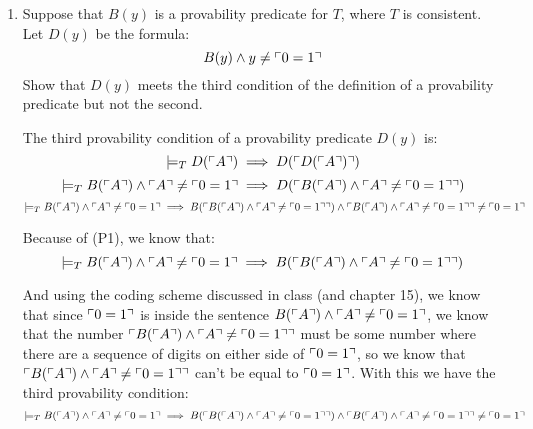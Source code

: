 \begin{enumerate}
  \item
    \begin{question}
      Suppose that $B(y)$ is a provability predicate for $T$, where $T$ is consistent. Let $D(y)$ be the formula:
      $$B(y) \land y \neq \ulcorner 0=1 \urcorner$$
      Show that $D(y)$ meets the third condition of the definition of a provability predicate but not the second.
    \end{question}

    The third provability condition of a provability predicate $D(y)$ is:
    $$\mathrel{|}\!=_T D(\ulcorner A \urcorner) \implies D(\ulcorner D(\ulcorner A \urcorner) \urcorner)$$
    $$\mathrel{|}\!=_T B(\ulcorner A \urcorner) \land \ulcorner A \urcorner \neq \ulcorner 0=1 \urcorner \implies D(\ulcorner B(\ulcorner A \urcorner) \land \ulcorner A \urcorner \neq \ulcorner 0=1 \urcorner \urcorner)$$
    $$\mathrel{|}\!=_T B(\ulcorner A \urcorner) \land \ulcorner A \urcorner \neq \ulcorner 0=1 \urcorner \implies B(\ulcorner B(\ulcorner A \urcorner) \land \ulcorner A \urcorner \neq \ulcorner 0=1 \urcorner \urcorner) \land \ulcorner B(\ulcorner A \urcorner) \land \ulcorner A \urcorner \neq \ulcorner 0=1 \urcorner \urcorner \neq \ulcorner 0=1 \urcorner$$

    Because of (P1), we know that:
    $$\mathrel{|}\!=_T B(\ulcorner A \urcorner) \land \ulcorner A \urcorner \neq \ulcorner 0=1 \urcorner \implies B(\ulcorner B(\ulcorner A \urcorner) \land \ulcorner A \urcorner \neq \ulcorner 0=1 \urcorner \urcorner)$$

    And using the coding scheme discussed in class (and chapter 15), we know that since $\ulcorner 0=1 \urcorner$ is inside the sentence $B(\ulcorner A \urcorner) \land \ulcorner A \urcorner \neq \ulcorner 0=1 \urcorner$, we know that the number $\ulcorner B(\ulcorner A \urcorner) \land \ulcorner A \urcorner \neq \ulcorner 0=1 \urcorner \urcorner$ must be some number where there are a sequence of digits on either side of $\ulcorner 0=1 \urcorner$, so we know that $\ulcorner B(\ulcorner A \urcorner) \land \ulcorner A \urcorner \neq \ulcorner 0=1 \urcorner \urcorner$ can't be equal to $\ulcorner 0=1 \urcorner$. With this we have the third provability condition:
    $$\mathrel{|}\!=_T B(\ulcorner A \urcorner) \land \ulcorner A \urcorner \neq \ulcorner 0=1 \urcorner \implies B(\ulcorner B(\ulcorner A \urcorner) \land \ulcorner A \urcorner \neq \ulcorner 0=1 \urcorner \urcorner) \land \ulcorner B(\ulcorner A \urcorner) \land \ulcorner A \urcorner \neq \ulcorner 0=1 \urcorner \urcorner \neq \ulcorner 0=1 \urcorner$$


\end{enumerate}
